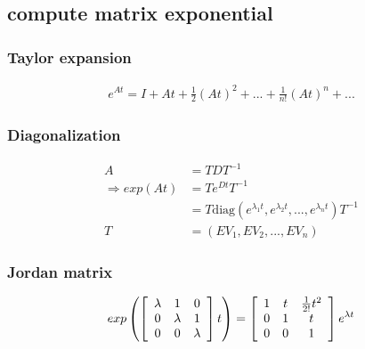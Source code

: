 \subsection{compute matrix exponential}
    \subsubsection{Taylor expansion}
        \begin{align*}
            e^{At} = I + At + \frac{1}{2}(At)^2 + ... + \frac{1}{n!}(At)^n + ...
        \end{align*}
    \subsubsection{Diagonalization}
        \begin{align*}
            A &= TDT^{-1}\\
            \Rightarrow exp(At) &= T e^{Dt} T^{-1}\\
            &= T \text{diag}(e^{\lambda_1 t}, e^{\lambda_2 t}, ..., e^{\lambda_n t}) T^{-1}\\
            T &= (EV_1, EV_2, ..., EV_n)
        \end{align*}
    \subsubsection{Jordan matrix}
        \begin{align*}
            exp\left(
                \left[
                    \begin{array}{c c c}
                        \lambda & 1 & 0\\
                        0 & \lambda & 1\\
                        0 & 0 & \lambda
                    \end{array}
                \right]
                t
            \right)
            =
            \left[
                \begin{array}{c c c}
                    1 & t & \frac{1}{2!} t^2\\
                    0 & 1 & t\\
                    0 & 0 & 1
                \end{array}
            \right]
            e^{\lambda t}
        \end{align*}